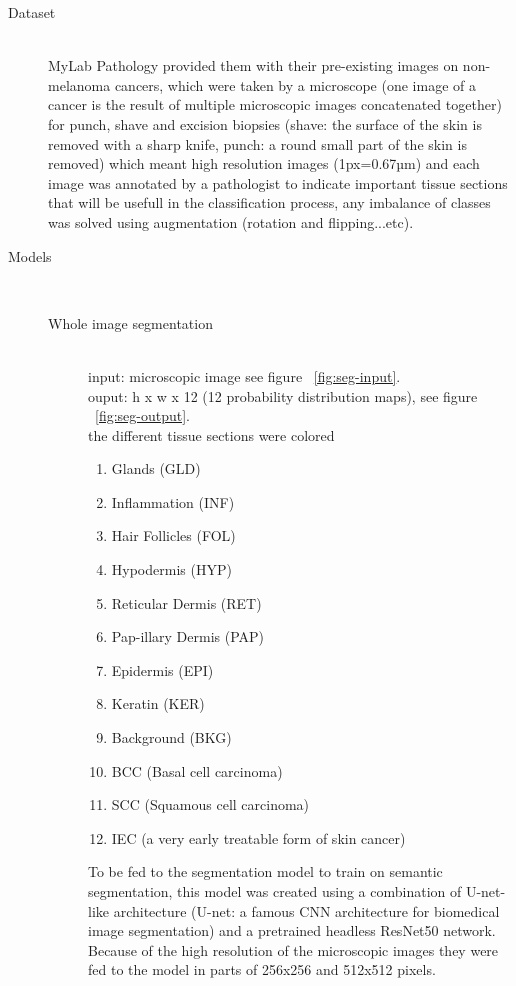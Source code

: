 \begin{description}
\item[Dataset] \hfill \\
    MyLab Pathology provided them with their pre-existing images on non-melanoma cancers, which were taken by a microscope (one image of a cancer is the result of multiple microscopic images concatenated together) for punch, shave and excision biopsies (shave: the surface of the skin is removed with a sharp knife, punch: a round small part of the skin is removed) which meant high resolution images (1px=0.67µm) and each image was annotated by a pathologist to indicate important tissue sections that will be usefull in the classification process, any imbalance of classes was solved using augmentation (rotation and flipping...etc).

\item[Models] \hfill \\
    \begin{description}
    \item[Whole image segmentation] \hfill \\
        input: microscopic image  see figure ~\ref{fig:seg-input}. \hfill \\
        ouput: h x w x 12 (12 probability distribution maps), see figure ~\ref{fig:seg-output}.  \hfill \\
        the different tissue sections were colored 
        \begin{enumerate}
            \item Glands (GLD) 
            \item Inflammation (INF) 
            \item Hair Follicles (FOL) 
            \item Hypodermis (HYP) 
            \item Reticular Dermis (RET) 
            \item Pap-illary Dermis (PAP) 
            \item Epidermis (EPI) 
            \item Keratin (KER) 
            \item Background (BKG) 
            \item BCC (Basal cell carcinoma)
            \item SCC (Squamous cell carcinoma)
            \item IEC (a very early treatable form of skin cancer)
        \end{enumerate}
        To be fed to the segmentation model to train on semantic segmentation, this model was created using a combination of U-net-like architecture (U-net: a famous CNN architecture for biomedical image segmentation) and a pretrained headless ResNet50 network. Because of the high resolution of the microscopic images they were fed to the model in parts of 256x256 and 512x512 pixels.


\end{description}
\end{description}
